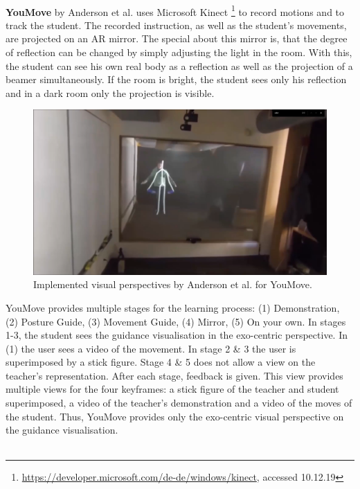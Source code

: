 $ $\\
\textbf{YouMove} by Anderson et al. \cite{Anderson2013a} uses Microsoft Kinect \footnote{\hyperlink{https://developer.microsoft.com/de-de/windows/kinect}{https://developer.microsoft.com/de-de/windows/kinect}, accessed 10.12.19} to record motions and to track the student. The recorded instruction, as well as the student's movements, are projected on an AR mirror. The special about this mirror is, that the degree of reflection can be changed by simply adjusting the light in the room. With this, the student can see his own real body as a reflection as well as the projection of a beamer simultaneously. If the room is bright, the student sees only his reflection and in a dark room only the projection is visible.\\ 
\begin{figure}
	\centering
	\includegraphics[width=1.0\textwidth]{img/YouMove.png}
	\caption{Implemented visual perspectives by Anderson et al. \cite{Anderson2013a} for YouMove.}
	\label{fig:youmovePerspectives}
\end{figure}
YouMove provides multiple stages for the learning process: (1) Demonstration, (2) Posture Guide, (3) Movement Guide, (4) Mirror, (5) On your own. In stages 1-3, the student sees the guidance visualisation in the exo-centric perspective. In (1) the user sees a video of the movement. In stage 2 \& 3 the user is superimposed by a stick figure. Stage 4 \& 5 does not allow a view on the teacher's representation. After each stage, feedback is given. This view provides multiple views for the four keyframes: a stick figure of the teacher and student superimposed, a video of the teacher's demonstration and a video of the moves of the student. Thus, YouMove provides only the exo-centric visual perspective on the guidance visualisation.\\ \\
